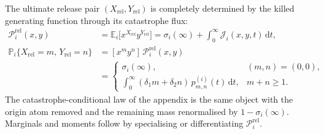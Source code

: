 \documentclass[11pt]{article}
\newcommand{\Prob}{\mathbb P}
\newcommand{\E}{\mathbb E}
\newcommand{\dd}{\mathrm d}
\newcommand{\Xrel}{X_{\mathrm{rel}}}
\newcommand{\Yrel}{Y_{\mathrm{rel}}}
\theoremstyle{plain}
\theoremstyle{definition}
\theoremstyle{remark}
\begin{document}
The ultimate release pair $(\Xrel,\Yrel)$ is completely determined by the killed generating
function through its catastrophe flux:
\begin{equation}
\label{eq:summary}
\boxed{
\begin{aligned}
\mathcal P_i^{\mathrm{rel}}(x,y)
&=
\E_i\bigl[x^{\Xrel}y^{\Yrel}\bigr]
=
\sigma_i(\infty)
+
\int_0^\infty
\mathcal J_i(x,y,t)\,
\dd t,
\\[0.4em]
\Prob_i\{\Xrel=m,\,\Yrel=n\}
&=
[x^my^n]\,\mathcal P_i^{\mathrm{rel}}(x,y)
\\
&=
\begin{cases}
\sigma_i(\infty),
& (m,n)=(0,0),\\[0.35em]
\displaystyle
\int_0^\infty
(\delta_1 m+\delta_2 n)\,
p_{m,n}^{(i)}(t)\,
\dd t,
& m+n\ge 1.
\end{cases}
\end{aligned}
}
\end{equation}
The catastrophe-conditional law of the appendix is the same object with the origin atom removed
and the remaining mass renormalised by $1-\sigma_i(\infty)$. Marginals and moments follow by
specialising or differentiating $\mathcal P_i^{\mathrm{rel}}$.
\end{document}
